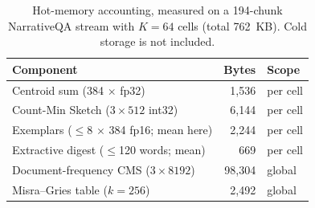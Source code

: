 \begin{table}[t]
\centering
\caption{Hot-memory accounting, measured on a 194-chunk NarrativeQA stream with $K{=}64$ cells (total 762~KB). Cold storage is not included.}
\label{tab:memory}
\setlength{\tabcolsep}{4pt}
\begin{tabular}{lrl}
\toprule
Component & Bytes & Scope \\
\midrule
Centroid sum (384 $\times$ fp32) & 1{,}536 & per cell \\
Count-Min Sketch ($3\times512$ int32) & 6{,}144 & per cell \\
Exemplars ($\le$8 $\times$ 384 fp16; mean here) & 2{,}244 & per cell \\
Extractive digest ($\le$120 words; mean) & 669 & per cell \\
Document-frequency CMS ($3\times8192$) & 98{,}304 & global \\
Misra--Gries table ($k{=}256$) & 2{,}492 & global \\
\bottomrule
\end{tabular}
\end{table}